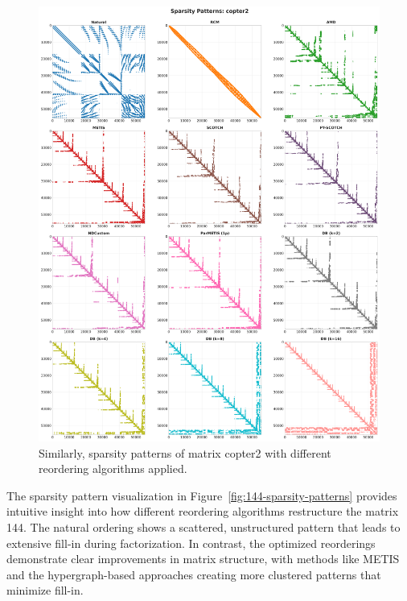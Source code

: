 \begin{figure}[h]
\centering
\includegraphics[width=\textwidth]{fig/res/copter2_sparsity_patterns.png}
\caption{Similarly, sparsity patterns of matrix copter2 with different reordering algorithms applied.}
\label{fig:copter2-sparsity-patterns}
\end{figure}

The sparsity pattern visualization in Figure~\ref{fig:144-sparsity-patterns} provides intuitive insight into how different reordering algorithms restructure the matrix 144. The natural ordering shows a scattered, unstructured pattern that leads to extensive fill-in during factorization. In contrast, the optimized reorderings demonstrate clear improvements in matrix structure, with methods like METIS and the hypergraph-based approaches creating more clustered patterns that minimize fill-in.


